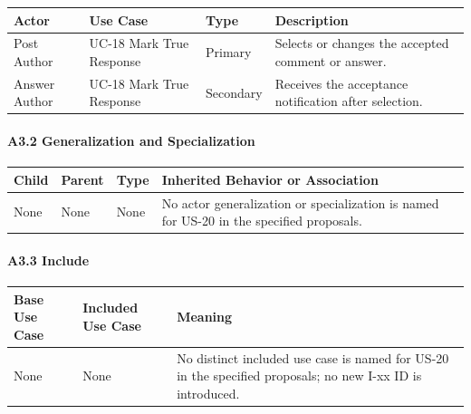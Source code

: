 \documentclass[12pt]{article}
\renewcommand{\baselinestretch}{1.5}
\begin{document}
\begingroup
\small
\renewcommand{\baselinestretch}{1.0}\selectfont
\renewcommand{\arraystretch}{1.15}
\setlength{\tabcolsep}{6pt}
\begin{longtable}{|>{\raggedright\arraybackslash}p{}|>{\raggedright\arraybackslash}p{}|>{\raggedright\arraybackslash}p{}|>{\raggedright\arraybackslash}p{}|}
\hline
\textbf{Actor} & \textbf{Use Case} & \textbf{Type} & \textbf{Description} \\ \hline
\endhead
Post Author & UC-18 Mark True Response & Primary & Selects or changes the accepted comment or answer. \\ \hline
Answer Author & UC-18 Mark True Response & Secondary & Receives the acceptance notification after selection. \\ \hline
\end{longtable}
\endgroup
\par\medskip

\hypertarget{sec:a3-2-generalization-and-specialization}{}
\paragraph*{A3.2 Generalization and Specialization}
\par\medskip

\begingroup
\small
\renewcommand{\baselinestretch}{1.0}\selectfont
\renewcommand{\arraystretch}{1.15}
\setlength{\tabcolsep}{6pt}
\begin{longtable}{|>{\raggedright\arraybackslash}p{}|>{\raggedright\arraybackslash}p{}|>{\raggedright\arraybackslash}p{}|>{\raggedright\arraybackslash}p{}|}
\hline
\textbf{Child} & \textbf{Parent} & \textbf{Type} & \textbf{Inherited Behavior or Association} \\ \hline
\endhead
None & None & None & No actor generalization or specialization is named for US-20 in the specified proposals. \\ \hline
\end{longtable}
\endgroup
\par\medskip

\hypertarget{sec:a3-3-include}{}
\paragraph*{A3.3 Include}
\par\medskip

\begingroup
\small
\renewcommand{\baselinestretch}{1.0}\selectfont
\renewcommand{\arraystretch}{1.15}
\setlength{\tabcolsep}{6pt}
\begin{longtable}{|>{\raggedright\arraybackslash}p{}|>{\raggedright\arraybackslash}p{}|>{\raggedright\arraybackslash}p{}|}
\hline
\textbf{Base Use Case} & \textbf{Included Use Case} & \textbf{Meaning} \\ \hline
\endhead
None & None & No distinct included use case is named for US-20 in the specified proposals; no new I-xx ID is introduced. \\ \hline
\end{longtable}
\endgroup
\par\medskip
\end{document}
